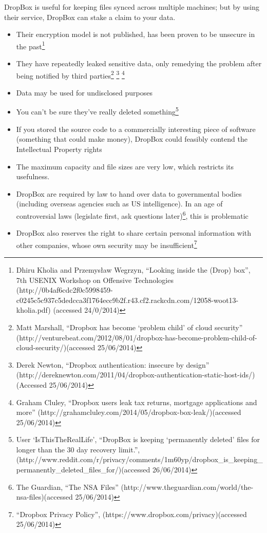 \documentclass[12pt,a4paper,]{adreport}
\begin{document}
DropBox is useful for keeping files synced across multiple machines; but
by using their service, DropBox can stake a claim to your data.

\begin{itemize}
\itemsep1pt\parskip0pt
\item
  Their encryption model is not published, has been proven to be
  unsecure in the past\footnote{Dhiru Kholia and Przemysław Wegrzyn,
    ``Looking inside the (Drop) box'', 7th USENIX Workshop on Offensive
    Technologies
    (http://0b4af6cdc2f0c5998459-c0245c5c937c5dedcca3f1764ecc9b2f.r43.cf2.rackcdn.com/12058-woot13-kholia.pdf)
    (accessed 24/0/2014)}
\item
  They have repeatedly leaked sensitive data, only remedying the problem
  after being notified by third parties\footnote{Matt Marshall,
    ``Dropbox has become `problem child' of cloud security''
    (http://venturebeat.com/2012/08/01/dropbox-has-become-problem-child-of-cloud-security/)(accessed
    25/06/2014)} \footnote{Derek Newton, ``Dropbox authentication:
    insecure by design''
    (http://dereknewton.com/2011/04/dropbox-authentication-static-host-ids/)(Accessed
    25/06/2014)} \footnote{Graham Cluley, ``Dropbox users leak tax
    returns, mortgage applications and more''
    (http://grahamcluley.com/2014/05/dropbox-box-leak/)(accessed
    25/06/2014)}
\item
  Data may be used for undisclosed purposes
\item
  You can't be sure they've really deleted something\footnote{User
    `IsThisTheRealLife', ``DropBox is keeping `permanently deleted'
    files for longer than the 30 day recovery limit.'',
    (http://www.reddit.com/r/privacy/comments/1m60yp/dropbox\_is\_keeping\_permanently\_deleted\_files\_for/)(accessed
    26/06/2014)}
\item
  If you stored the source code to a commercially interesting piece of
  software (something that could make money), DropBox could feasibly
  contend the Intellectual Property rights
\item
  The maximum capacity and file sizes are very low, which restricts its
  usefulness.
\item
  DropBox are required by law to hand over data to governmental bodies
  (including overseas agencies such as US intelligence). In an age of
  controversial laws (legislate first, ask questions later)\footnote{The
    Guardian, ``The NSA Files''
    (http://www.theguardian.com/world/the-nsa-files)(accessed
    25/06/2014)}, this is problematic
\item
  DropBox also reserves the right to share certain personal information
  with other companies, whose own security may be insufficient\footnote{``Dropbox
    Privacy Policy'', (https://www.dropbox.com/privacy)(accessed
    25/06/2014)}
\end{itemize}
\end{document}
